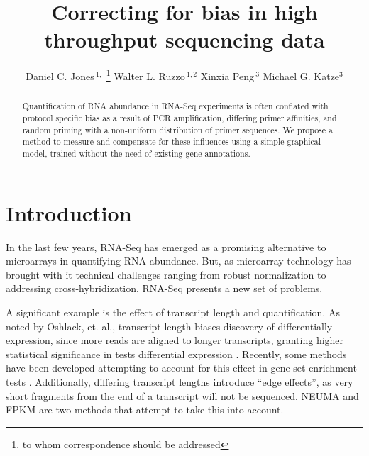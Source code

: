 \documentclass{bioinfo}
\begin{document}

\title{Correcting for bias in high throughput sequencing data}
\author[Jones \textit{et~al}]
{Daniel C. Jones\,$^{1,}$
\footnote{to whom correspondence should be addressed}\hspace{0.5em}
Walter L. Ruzzo\,$^{1,2}$
Xinxia Peng\,$^{3}$
Michael G. Katze$^{3}$
}


\address{
$^{1}$Deportment of Computer Science and Engineering, University of
Washington, Seattle, WA 98195-2350, USA\\
$^{2}$Fred Hutchinson Cancer Research Center, Seattle, WA 98109\\
$^{3}$Department of Microbiology, University of Washington, Seattle, WA
98195-7242, USA}


\maketitle

\begin{abstract}
Quantification of RNA abundance in RNA-Seq experiments is often conflated with
protocol specific bias as a result of PCR amplification, differing primer
affinities, and random priming with a non-uniform distribution of primer
sequences.  We propose a method to measure and compensate for these influences
using a simple graphical model, trained without the need of existing gene
annotations.
\end{abstract}

\section{Introduction}

In the last few years, RNA-Seq has emerged as a promising alternative to
microarrays in quantifying RNA abundance. But, as microarray technology has
brought with it technical challenges ranging from robust normalization to
addressing cross-hybridization, RNA-Seq presents a new set of problems.

A significant example is the effect of transcript length and quantification.
As noted by Oshlack, et. al., transcript length biases discovery of differentially
expression, since more reads are aligned to longer transcripts, granting
higher statistical significance in tests differential expression
\cite{Oshlack2009}. Recently, some methods have been developed attempting to account for
this effect in gene set enrichment tests \cite{Young2010} \cite{Gao2011}.
Additionally, differing transcript lengths introduce ``edge
effects'', as very short fragments from the end of a transcript will not be
sequenced. NEUMA \cite{Lee2010} and FPKM \cite{Trapnell2010} are two methods
that attempt to take this into account.
\end{document}
